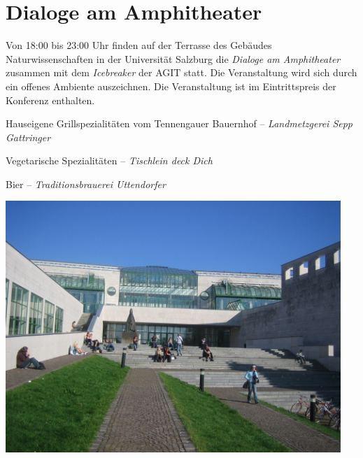 \newpage
\thispagestyle{empty}
\section*{Dialoge am Amphitheater}
\label{social-event}
Von 18:00 bis 23:00 Uhr finden auf der Terrasse des Gebäudes Naturwissenschaften in der Universität Salzburg
die \emph{Dialoge am Amphitheater} zusammen mit dem \emph{Icebreaker} der AGIT statt.
Die Veranstaltung wird sich durch ein offenes Ambiente auszeichnen. Die Veranstaltung ist im Eintrittspreis der Konferenz enthalten.

\begin{center}
\noindent Hauseigene Grillspezialitäten vom Tennengauer Bauernhof -- \emph{Landmetzgerei Sepp Gattringer}

\vspace{0.5\baselineskip}
\noindent Vegetarische Spezialitäten -- \emph{Tischlein deck Dich}

\vspace{0.5\baselineskip}
\noindent Bier -- \emph{Traditionsbrauerei Uttendorfer}

\enlargethispage{3\baselineskip}
\vspace{1.5\baselineskip}
\noindent\includegraphics[width=0.95\textwidth]{images-print/nawi-rueckeingang.jpg}
\end{center}

\justifying
